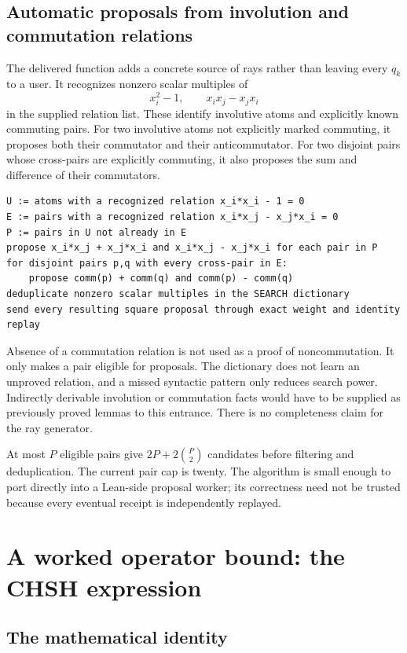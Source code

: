 \subsection{Automatic proposals from involution and commutation relations}
\label{sec:graph-dictionary}

The delivered function  adds a concrete source of
rays rather than leaving every $q_k$ to a user. It recognizes nonzero scalar
multiples of
\[
 x_i^2-1,\qquad x_ix_j-x_jx_i
\]
in the supplied relation list. These identify involutive atoms and explicitly
known commuting pairs. For two involutive atoms not explicitly marked commuting,
it proposes both their commutator and their anticommutator. For two disjoint
pairs whose cross-pairs are explicitly commuting, it also proposes the sum and
difference of their commutators.

\begin{lstlisting}
U := atoms with a recognized relation x_i*x_i - 1 = 0
E := pairs with a recognized relation x_i*x_j - x_j*x_i = 0
P := pairs in U not already in E
propose x_i*x_j + x_j*x_i and x_i*x_j - x_j*x_i for each pair in P
for disjoint pairs p,q with every cross-pair in E:
    propose comm(p) + comm(q) and comm(p) - comm(q)
deduplicate nonzero scalar multiples in the SEARCH dictionary
send every resulting square proposal through exact weight and identity replay
\end{lstlisting}

Absence of a commutation relation is not used as a proof of noncommutation. It
only makes a pair eligible for proposals. The dictionary does not learn an
unproved relation, and a missed syntactic pattern only reduces search power.
Indirectly derivable involution or commutation facts would have to be supplied
as previously proved lemmas to this entrance. There is no completeness claim
for the ray generator.

At most $P$ eligible pairs give $2P+2\binom P2$ candidates before filtering and
deduplication. The current pair cap is twenty. The algorithm is small enough to
port directly into a Lean-side proposal worker; its correctness need not be
trusted because every eventual receipt is independently replayed.

\section{A worked operator bound: the CHSH expression}
\label{sec:chsh}

\subsection{The mathematical identity}

